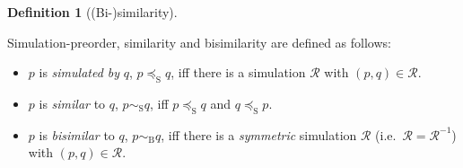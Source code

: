 \documentclass[
  a4paper,
]{report}
\providecommand{\tightlist}{%
  \setlength{\itemsep}{0pt}\setlength{\parskip}{0pt}}\usepackage{longtable,booktabs,array}
\theoremstyle{plain}
\theoremstyle{plain}
\theoremstyle{definition}
\newtheorem{definition}{Definition}[section]
\theoremstyle{plain}
\theoremstyle{definition}
\theoremstyle{remark}
\begin{document}
\begin{definition}[(Bi-)similarity]\protect\hypertarget{def-bisimilarity}{}\label{def-bisimilarity}

Simulation-preorder, similarity and bisimilarity are defined as follows:

\begin{itemize}
\tightlist
\item
  \(p\) is \emph{simulated by} \(q\), \(p \preceq_\mathrm{S} q\), iff
  there is a simulation \(\mathcal{R}\) with \((p, q) ∈ \mathcal{R}\).
\item
  \(p\) is \emph{similar} to \(q\), \(p \sim_\mathrm{S} q\), iff
  \(p \preceq_\mathrm{S} q\) and \(q \preceq_\mathrm{S} p\).
\item
  \(p\) is \emph{bisimilar} to \(q\), \(p \sim_\mathrm{B} q\), iff there
  is a \emph{symmetric} simulation \(\mathcal{R}\)
  (i.e.~\(\mathcal{R} = \mathcal{R}^{-1}\)) with
  \((p, q) ∈ \mathcal{R}\).
\end{itemize}

\end{definition}
\end{document}
